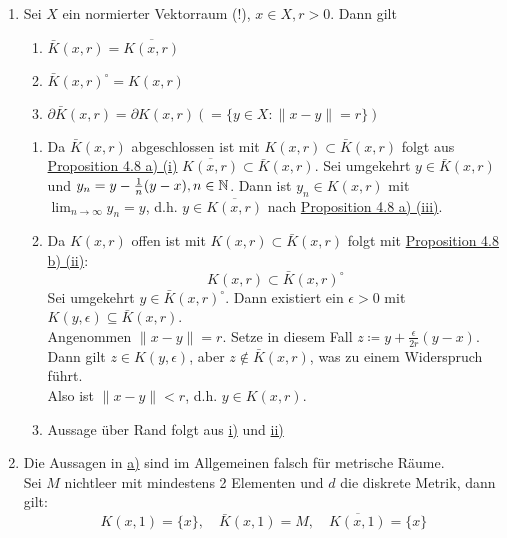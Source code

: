 \begin{beispiel} \label{bsp:4.11}
	\begin{enumerate}[label=\alph*\upshape)]
		\item \label{bsp:4.11.a} Sei $X$ ein normierter Vektorraum (!), $x \in X, r > 0$. Dann gilt
			\begin{enumerate}
				\item $\bar K(x, r) = \overline{K(x, r)}$ \label{bsp:4.11.a.i}
				\item $\bar K(x, r)^{\circ} = K(x, r)$ \label{bsp:4.11.a.ii}
				\item $\partial \bar K(x, r) = \partial K(x, r) (= \{ y \in X: \| x - y \| = r \} ) $	\label{bsp:4.11.a.iii}
			\end{enumerate}
			\begin{beweis}
				\begin{enumerate}
					\item Da $ \bar K(x, r)$ abgeschlossen ist mit $K(x, r) \subset \bar K(x, r)$ folgt aus \hyperref[prop:4.8.a1]{Proposition 4.8  a) (i)} $\overline{K(x, r)} \subset \bar K(x, r)$.
						Sei umgekehrt $y \in \bar K(x, r)$ und $y_{n} = y - \frac{1}{n} (y - x), n \in \mathbb{N}$. Dann ist $y_{n} \in K(x, r)$ mit $\lim_{n \rightarrow \infty} y_{n} = y$, d.h. $y \in \overline{K(x, r)}$ nach \hyperref[prop:4.8.a3]{Proposition 4.8 a) (iii)}.
					\item Da $K(x, r)$ offen ist mit $K(x, r) \subset \bar K(x, r)$ folgt mit \hyperref[prop:4.8.b2]{Proposition 4.8 b) (ii)}: 
						\[ K(x, r) \subset \bar K(x, r)^{\circ} \]
						Sei umgekehrt $y \in \bar K(x, r)^{\circ}$. Dann existiert ein $\epsilon > 0$ mit $K(y, \epsilon) \subseteq \bar K(x, r)$. \\
						Angenommen $\| x - y \| = r$. Setze in diesem Fall $z \coloneqq y + \frac{\epsilon}{2 r} (y - x)$. Dann gilt $z \in K(y, \epsilon)$, aber $z \notin \bar K(x, r)$, was zu einem Widerspruch führt. \\
						Also ist $\| x - y \| < r$, d.h. $y \in K(x, r)$.
					\item Aussage über Rand folgt aus \hyperref[bsp:4.11.a.i]{i)} und \hyperref[bsp:4.11.a.ii]{ii)}		
				\end{enumerate}
			\end{beweis}
		\item Die Aussagen in \hyperref[bsp:4.11.a]{a)} sind im Allgemeinen falsch für metrische Räume. \\
			Sei $M$ nichtleer mit mindestens 2 Elementen und $d$ die diskrete Metrik, dann gilt:
			\[ K(x, 1) = \{ x \}, \quad \bar K(x, 1) = M, \quad \overline{K(x, 1)} = \{ x \} \]

\end{enumerate}
\end{beispiel}
